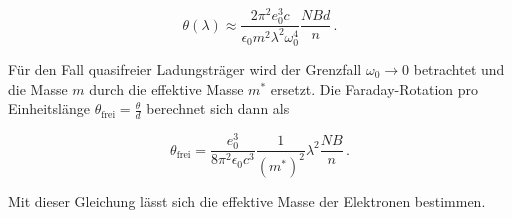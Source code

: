\begin{equation*}
    \theta(\lambda)\approx \frac{2 \pi^2 e_0^3 c}{\epsilon_0 m^2 \lambda^2 \omega_0^4}\frac{NBd}{n}\,.
\end{equation*}

Für den Fall quasifreier Ladungsträger wird der Grenzfall $\omega_0 \rightarrow 0$ betrachtet und die Masse $m$ durch die effektive Masse $m^*$
ersetzt. Die Faraday-Rotation pro Einheitslänge $\theta_\text{frei} = \frac{\theta}{d}$ berechnet sich dann als 

\begin{equation*}
    \theta_\text{frei} = \frac{e_0^3}{8\pi^2\epsilon_0 c^3} \frac{1}{(m^*)^2}\lambda^2\frac{NB}{n}\,.
\end{equation*}

Mit dieser Gleichung lässt sich die effektive Masse der Elektronen bestimmen. 